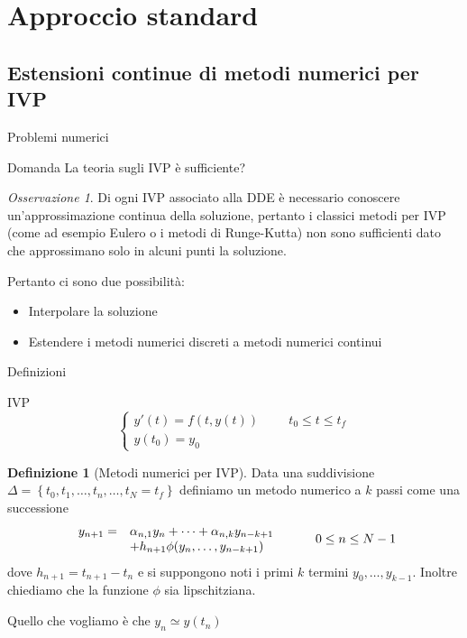 \documentclass[intlimits]{beamer}
\numberwithin{equation}{section}
\theoremstyle{plain}
\theoremstyle{definition}
\newtheorem{defin}[teor]{Definizione}
\theoremstyle{remark}
\newtheorem{oss}[teor]{Osservazione}
\begin{document}
\section{Approccio standard}

\subsection{Estensioni continue di metodi numerici per IVP}

\begin{frame}{Problemi numerici}

\pause
\begin{block}{Domanda}
 La teoria sugli IVP è sufficiente?
\end{block}
\pause
\begin{oss}
 Di ogni IVP associato alla DDE è necessario conoscere un'approssimazione continua della soluzione, pertanto i classici metodi per 
 IVP (come ad esempio Eulero o i metodi di Runge-Kutta) non sono sufficienti dato che approssimano solo in alcuni punti la soluzione.
\end{oss}
\pause
Pertanto ci sono due possibilità:
\begin{itemize}
 \item Interpolare la soluzione
 \item Estendere i metodi numerici discreti a metodi numerici continui
\end{itemize}
\end{frame}

\begin{frame}{Definizioni}

\pause
\begin{block}{IVP}
$$
 \begin{cases}
  y'(t)=f(t,y(t))	\hspace{1cm}	t_0 \le t \le t_f	\\
  y(t_0)=y_0
 \end{cases}
$$
\end{block}
\pause
 \begin{defin}[Metodi numerici per IVP]
 Data una suddivisione $\Delta= \left \{ t_0, t_1, \dots , t_n , \dots , t_N = t_f \right \}$ definiamo 
un metodo numerico a $k$ passi come una successione
$$
\begin{array}{c lc}
y_{n+1} = & \alpha_{n,1} y_n + \dots +\alpha_{n,k} y_{n-k+1} \\
	  & + h_{n+1} \phi (y_n, \dots , y_{n-k+1})
\end{array}
\hspace{1cm}
0 \le n \le N-1
$$
dove $h_{n+1}=t_{n+1}-t_n$ e si suppongono noti i primi $k$ termini $y_0, \dots , y_{k-1}$.
Inoltre chiediamo che la funzione $\phi$ sia lipschitziana.
\end{defin}

\pause
 Quello che vogliamo è che $y_n \simeq y(t_n)$


\end{frame}
\end{document}
